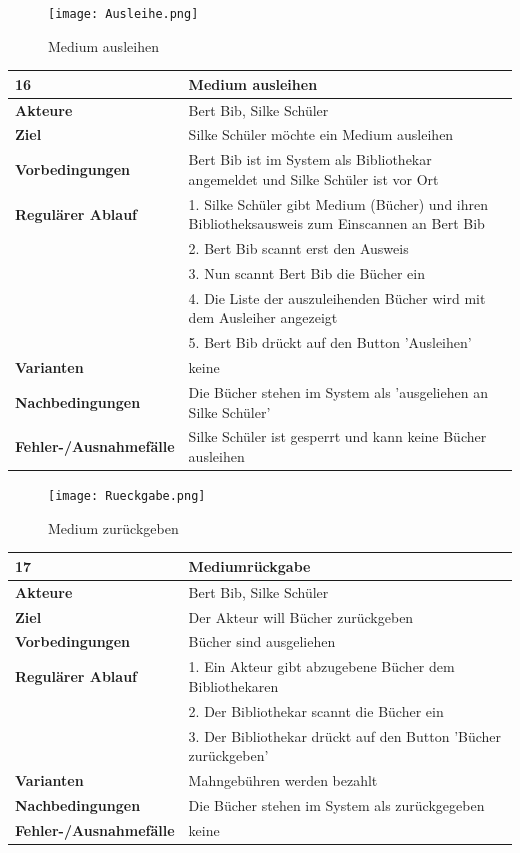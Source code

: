 \documentclass[fontsize=12pt,paper=a4,twoside]{scrartcl}
\begin{document}
\begin{figure}
	[H] \caption{Medium ausleihen} 
	\texttt{[image: Ausleihe.png]}
	\label{pic:MedAusleihen} 
\end{figure}
\begin{table}
	[H] \label{16} 
	\begin{tabular}
		{|l|p{10cm}|} \hline \textbf{16} & \textbf{Medium ausleihen} \\
		\hline \textbf{Akteure} & Bert Bib, Silke Schüler\\
		\hline \textbf{Ziel} & Silke Schüler möchte ein Medium ausleihen \\
		\hline \textbf{Vorbedingungen} & Bert Bib ist im System als Bibliothekar angemeldet und Silke Schüler ist vor Ort \\
		\hline \textbf{Regulärer Ablauf} & 1. Silke Schüler gibt Medium (Bücher) und ihren Bibliotheksausweis zum Einscannen an Bert Bib\\
		&2. Bert Bib scannt erst den Ausweis\\
		&3. Nun scannt Bert Bib die Bücher ein\\
		&4. Die Liste der auszuleihenden Bücher wird mit dem Ausleiher angezeigt\\
		&5. Bert Bib drückt auf den Button 'Ausleihen'\\
		\hline \textbf{Varianten} & keine \\
		\hline \textbf{Nachbedingungen} & Die Bücher stehen im System als 'ausgeliehen an Silke Schüler'\\
		\hline \textbf{Fehler-/Ausnahmefälle} & Silke Schüler ist gesperrt und kann keine Bücher ausleihen\\
		\hline 
	\end{tabular}
\end{table}
\begin{figure}
	[H] \caption{Medium zurückgeben} 
	\texttt{[image: Rueckgabe.png]} \label{pic:MedRueckgabe} 
\end{figure}
\begin{table}
	[H] \label{17} 
	\begin{tabular}
		{|l|p{10cm}|} \hline \textbf{17} & \textbf{Mediumrückgabe} \\
		\hline \textbf{Akteure} & Bert Bib, Silke Schüler\\
		\hline \textbf{Ziel} & Der Akteur will Bücher zurückgeben \\
		\hline \textbf{Vorbedingungen} & Bücher sind ausgeliehen \\
		\hline \textbf{Regulärer Ablauf} & 1. Ein Akteur gibt abzugebene Bücher dem Bibliothekaren \\
		&2. Der Bibliothekar scannt die Bücher ein\\
		&3. Der Bibliothekar drückt auf den Button 'Bücher zurückgeben'\\
		\hline \textbf{Varianten} & Mahngebühren werden bezahlt \\
		\hline \textbf{Nachbedingungen} & Die Bücher stehen im System als zurückgegeben\\
		\hline \textbf{Fehler-/Ausnahmefälle} & keine\\
		\hline 
	\end{tabular}
\end{table}
\end{document}
